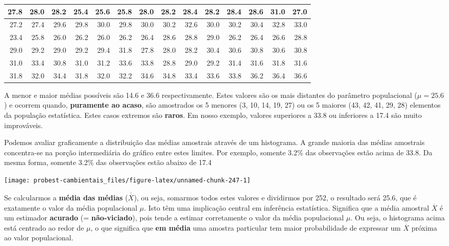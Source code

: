 \documentclass[
]{book}
\begin{document}
\begin{tabular}{r|r|r|r|r|r|r|r|r|r|r|r|r|r}
\hline
27.8 & 28.0 & 28.2 & 25.4 & 25.6 & 25.8 & 28.0 & 28.2 & 28.4 & 28.2 & 28.4 & 28.6 & 31.0 & 27.0\\
\hline
27.2 & 27.4 & 29.6 & 29.8 & 30.0 & 29.8 & 30.0 & 30.2 & 32.6 & 30.0 & 30.2 & 30.4 & 32.8 & 33.0\\
\hline
23.4 & 25.8 & 26.0 & 26.2 & 26.0 & 26.2 & 26.4 & 28.6 & 28.8 & 29.0 & 26.2 & 26.4 & 26.6 & 28.8\\
\hline
29.0 & 29.2 & 29.0 & 29.2 & 29.4 & 31.8 & 27.8 & 28.0 & 28.2 & 30.4 & 30.6 & 30.8 & 30.6 & 30.8\\
\hline
31.0 & 33.4 & 30.8 & 31.0 & 31.2 & 33.6 & 33.8 & 28.8 & 29.0 & 29.2 & 31.4 & 31.6 & 31.8 & 31.6\\
\hline
31.8 & 32.0 & 34.4 & 31.8 & 32.0 & 32.2 & 34.6 & 34.8 & 33.4 & 33.6 & 33.8 & 36.2 & 36.4 & 36.6\\
\hline
\end{tabular}

A menor e maior médias possíveis são 14.6 e 36.6 respectivamente. Estes valores são os mais distantes do parâmetro populacional (\(\mu = 25.6\)) e ocorrem quando, \textbf{puramente ao acaso}, são amostrados os 5 menores (3, 10, 14, 19, 27) ou os 5 maiores (43, 42, 41, 29, 28) elementos da população estatística. Estes casos extremos são \textbf{raros}. Em nosso exemplo, valores superiores a 33.8 ou inferiores a 17.4 são muito improváveis.

Podemos avaliar graficamente a distribuição das médias amostrais através de um histograma. A grande maioria das médias amostrais concentra-se na porção intermediária do gráfico entre estes limites. Por exemplo, somente 3.2\% das observações estão acima de 33.8. Da mesma forma, somente 3.2\% das observações estão abaixo de 17.4

\begin{center}\texttt{[image: probest-cambientais\_files/figure-latex/unnamed-chunk-247-1]} \end{center}

Se calcularmos a \textbf{média das médias} (\(\overline{\overline{X}}\)), ou seja, somarmos todos estes valores e dividirmos por 252, o resultado será 25.6, que é exatamente o valor da média populacional \(\mu\). Isto têm uma implicação central em inferência estatística. Significa que a média amostral \(\overline{X}\) é um estimador \textbf{acurado} (= \textbf{não-viciado}), pois tende a estimar corretamente o valor da média populacional \(\mu\). Ou seja, o histograma acima está centrado ao redor de \(\mu\), o que significa que \textbf{em média} uma amostra particular tem maior probabilidade de expressar um \(\overline{X}\) próxima ao valor populacional.
\end{document}
